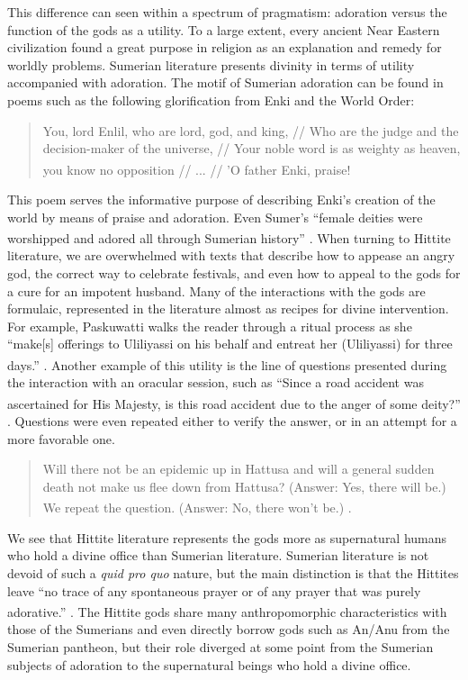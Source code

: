 This difference can seen within a spectrum of pragmatism: adoration
versus the function of the gods as a utility.  To a large extent,
every ancient Near Eastern civilization found a great purpose in
religion as an explanation and remedy for worldly problems. Sumerian
literature presents divinity in terms of utility accompanied with
adoration.
The motif of Sumerian adoration can be found in poems such as the
following glorification from Enki and the World Order:
\begin{quote}
You, lord Enlil, who are lord, god, and king, //
Who are the judge and the decision-maker of the universe, //
Your noble word is as weighty as heaven, you know no opposition //
... //
'O father Enki, praise! \textsuperscript{\cite[p.44]{kramer}}
\end{quote}
This poem serves the informative purpose of describing Enki's creation
of the world by means of praise and adoration.  Even Sumer's ``female
deities were worshipped and adored all through Sumerian
history'' \textsuperscript{\cite[p.71]{kramer}}. When turning to
Hittite literature, we are overwhelmed with texts that describe how to
appease an angry god, the correct way to celebrate festivals, and even
how to appeal to the gods for a cure for an impotent husband.  Many of
the interactions with the gods are formulaic, represented in the
literature almost as recipes for divine intervention.  For example,
Paskuwatti walks the reader through a ritual process as she ``make[s]
offerings to Uliliyassi on his behalf and entreat her (Uliliyassi) for
three days.'' \textsuperscript{\cite[p.2014]{sasson}}.  Another
example of this utility is the line of questions presented during the
interaction with an oracular session, such as ``Since a road accident
was ascertained for His Majesty, is this road accident due to the
anger of some deity?'' \textsuperscript{\cite[p.30]{beal}}.  Questions
were even repeated either to verify the answer, or in an attempt for a
more favorable one.
\begin{quote}
Will there not be an epidemic up in Hattusa and will a general sudden
death not make us flee down from Hattusa? (Answer: Yes, there will
be.) We repeat the question. (Answer: No, there won't
be.) \textsuperscript{\cite[p.30]{beal}}.
\end{quote}
We see that Hittite literature represents the gods more as
supernatural humans who hold a divine office than Sumerian literature.
Sumerian literature is not devoid of such a \emph{quid pro quo}
nature, but the main distinction is that the Hittites leave ``no trace
of any spontaneous prayer or of any prayer that was purely
adorative.''  \textsuperscript{\cite[p.359]{johnston}}.  The Hittite
gods share many anthropomorphic characteristics with those of the
Sumerians and even directly borrow gods such as An/Anu from the
Sumerian pantheon, but their role diverged at some point from the
Sumerian subjects of adoration to the supernatural beings who hold a
divine office.







\bib





